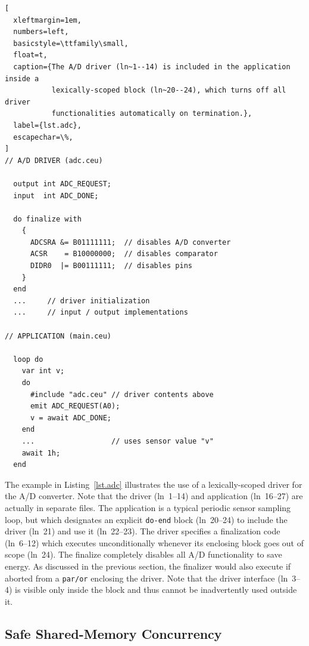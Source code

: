 \documentclass[sigplan,10pt,review,anonymous]{acmart}\settopmatter{printfolios=true,printccs=false,printacmref=false}
\newcommand{\code}[1] {{\small{\texttt{#1}}}}
\begin{document}
\begin{lstlisting}[
  xleftmargin=1em,
  numbers=left,
  basicstyle=\ttfamily\small,
  float=t,
  caption={The A/D driver (ln~1--14) is included in the application inside a
           lexically-scoped block (ln~20--24), which turns off all driver
           functionalities automatically on termination.},
  label={lst.adc},
  escapechar=\%,
]
// A/D DRIVER (adc.ceu)

  output int ADC_REQUEST;
  input  int ADC_DONE;

  do finalize with
    {
      ADCSRA &= B01111111;  // disables A/D converter
      ACSR    = B10000000;  // disables comparator
      DIDR0  |= B00111111;  // disables pins
    }
  end
  ...     // driver initialization
  ...     // input / output implementations

// APPLICATION (main.ceu)

  loop do
    var int v;
    do
      #include "adc.ceu" // driver contents above
      emit ADC_REQUEST(A0);
      v = await ADC_DONE;
    end
    ...                  // uses sensor value "v"
    await 1h;
  end
\end{lstlisting}

The example in Listing~\ref{lst.adc} illustrates the use of a lexically-scoped
driver for the A/D converter.
Note that the driver (ln~1--14) and application (ln~16--27) are actually in
separate files.
%
The application is a typical periodic sensor sampling loop, but which
designates an explicit \code{do-end} block (ln~20--24) to include the driver
(ln~21) and use it (ln~22--23).
%
The driver specifies a finalization code (ln~6--12) which executes
unconditionally whenever its enclosing block goes out of scope (ln~24).
The finalize completely disables all A/D functionality to save energy.
%
As discussed in the previous section, the finalizer would also execute if
aborted from a \code{par/or} enclosing the driver.
%
Note that the driver interface (ln~3--4) is visible only inside the block and
thus cannot be inadvertently used outside it.

\subsection{Safe Shared-Memory Concurrency}
\label{sec.ceu.shared}
\end{document}
